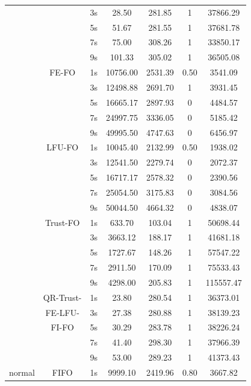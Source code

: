 \begin{center}
\begin{longtable}{|c||c||c|c|c|c|c|}
			  &		     & 3s & 28.50 & 281.85 & 1& 37866.29\\ \cline{3-7}
			  &          & 5s & 51.67 & 281.55 & 1& 37681.78\\ \cline{3-7}
			  &          & 7s & 75.00 & 308.26 & 1& 33850.17\\ \cline{3-7}
			  &          & 9s & 101.33 & 305.02 & 1& 36505.08\\ \cline{2-7}
			  & FE-FO & 1s & 10756.00 & 2531.39 & 0.50 & 3541.09 \\ \cline{3-7}
			  &		  & 3s & 12498.88 & 2691.70 & 1 & 3931.45 \\ \cline{3-7}
			  &       & 5s & 16665.17 & 2897.93 & 0 & 4484.57 \\ \cline{3-7}
			  &       & 7s & 24997.75 & 3336.05 & 0 & 5185.42 \\ \cline{3-7}
			  &       & 9s & 49995.50 & 4747.63 & 0 & 6456.97 \\ \cline{2-7}
			  & LFU-FO & 1s & 10045.40 & 2132.99 & 0.50 & 1938.02 \\ \cline{3-7}
			  &		   & 3s & 12541.50 & 2279.74 & 0 & 2072.37 \\ \cline{3-7}
			  &        & 5s & 16717.17 & 2578.32 & 0 & 2390.56 \\ \cline{3-7}
			  &        & 7s & 25054.50 & 3175.83 & 0 & 3084.56 \\ \cline{3-7}
			  &        & 9s & 50044.50 & 4664.32 & 0 & 4838.07 \\ \cline{2-7}
			  & Trust-FO & 1s & 633.70 & 103.04 & 1 & 50698.44\\ \cline{3-7}
			  &			 & 3s & 3663.12 & 188.17 & 1& 41681.18\\ \cline{3-7}
			  &          & 5s & 1727.67 & 148.26 & 1& 57547.22\\ \cline{3-7}
			  &          & 7s & 2911.50 & 170.09 & 1& 75533.43\\ \cline{3-7}
			  &          & 9s & 4298.00 & 205.83 & 1& 115557.47\\ \cline{2-7}
              & QR-Trust- & 1s & 23.80 & 280.54 & 1& 36373.01\\ \cline{3-7}
			  &	FE-LFU-   & 3s & 27.38 & 280.88 & 1& 38139.23\\ \cline{3-7}
			  & FI-FO     & 5s & 30.29 & 283.78 & 1& 38226.24\\ \cline{3-7}
			  &           & 7s & 41.40 & 298.30 & 1& 37966.39\\ \cline{3-7}
			  &           & 9s & 53.00 & 289.23 & 1& 41373.43\\ \hhline{|=#=#=|=|=|=|=|}
        normal & FIFO & 1s & 9999.10 & 2419.96 & 0.80 & 3667.82 \\ \cline{3-7}

\end{longtable}
\end{center}
